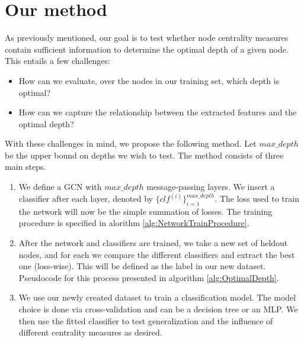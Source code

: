 \documentclass[11pt,a4paper]{article}
\begin{document}
\section{Our method}
\label{sec:OurMethod}
	As previously mentioned, our goal is to test whether node centrality measures contain sufficient information to determine the optimal depth of a given node. This entails a few challenges:
	\begin{itemize}
		\item How can we evaluate, over the nodes in our training set, which depth is optimal?
		\item How can we capture the relationship between the extracted features and the optimal depth?
	\end{itemize}
	With these challenges in mind, we propose the following method. Let $max\_depth$ be the upper bound on depths we wish to test. The method consists of three main steps.
	\begin{enumerate}
		\item We define a GCN with $max\_depth$ message-passing layers. We insert a classifier after each layer, denoted by $\{clf^{(i)}\}_{i=1}^{max\_depth}$. The loss used to train the network will now be the simple summation of losses. The training procedure is specified in alorithm \ref{alg:NetworkTrainProcedure}.
		\item After the network and classifiers are trained, we take a new set of heldout nodes, and for each we compare the different classifiers and extract the best one (loss-wise). This will be defined as the label in our new dataset. Pseudocode for this process presented in algorithm \ref{alg:OptimalDepth}.
		\item We use our newly created dataset to train a classification model. The model choice is done via cross-validation and can be a decision tree or an MLP. We then use the fitted classifier to test generalization and the influence of different centrality measures as desired.
	\end{enumerate}
\end{document}
